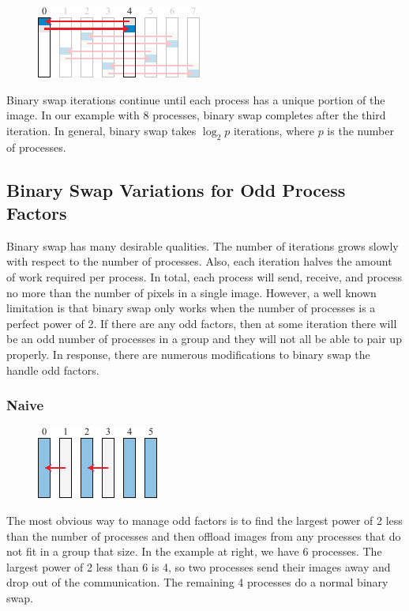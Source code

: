 \documentclass{vgtc}                          %
\begin{document}
\begin{figure}
  \includegraphics[scale=.75]{binary-swap-3}
\end{figure}
Binary swap iterations continue until each process has a unique portion of the image.
In our example with 8 processes, binary swap completes after the third iteration.
In general, binary swap takes $\log_{2}p$ iterations, where $p$ is the number of processes.

\subsection{Binary Swap Variations for Odd Process Factors}
\label{sec:BinarySwapVariations}

Binary swap has many desirable qualities.
The number of iterations grows slowly with respect to the number of processes.
Also, each iteration halves the amount of work required per process.
In total, each process will send, receive, and process no more than the number of pixels in a single image.
However, a well known limitation is that binary swap only works when the number of processes is a perfect power of 2.
If there are any odd factors, then at some iteration there will be an odd number of processes in a group and they will not all be able to pair up properly.
In response, there are numerous modifications to binary swap the handle odd factors.

\subsubsection{Naive}

\begin{figure}
  \includegraphics[scale=.75]{naive}
\end{figure}
The most obvious way to manage odd factors is to find the largest power of 2 less than the number of processes and then offload images from any processes that do not fit in a group that size.
In the example at right, we have 6 processes.
The largest power of 2 less than 6 is 4, so two processes send their images away and drop out of the communication.
The remaining 4 processes do a normal binary swap.
\end{document}
